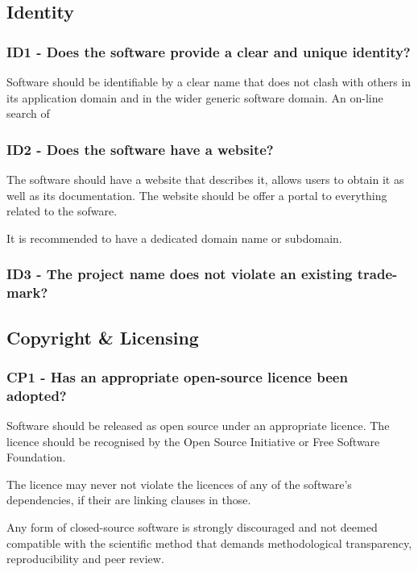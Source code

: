 \documentclass[a4paper,11pt]{article}
\begin{document}
\subsection{Identity}

\subsubsection{ID1 - Does the software provide a clear and unique identity?}

Software should be identifiable by a clear name that does not clash with others
in its application domain and in the wider generic software domain. An on-line
search of 

\subsubsection{ID2 - Does the software have a website?}

The software should have a website that describes it, allows users to obtain
it as well as its documentation. The website should be offer a portal to everything
related to the sofware.

It is recommended to have a dedicated domain name or subdomain.

\subsubsection{ID3 - The project name does not violate an existing trade-mark?}

\subsection{Copyright \& Licensing}

\subsubsection{CP1 - Has an appropriate open-source licence been adopted?}

Software should be released as open source under an appropriate licence. The
licence should be recognised by the Open Source Initiative or Free Software
Foundation.

The licence may never not violate the licences of any of the software's
dependencies, if their are linking clauses in those.

Any form of closed-source software is strongly discouraged and not deemed
compatible with the scientific method that demands methodological transparency,
reproducibility and peer review.
\end{document}
